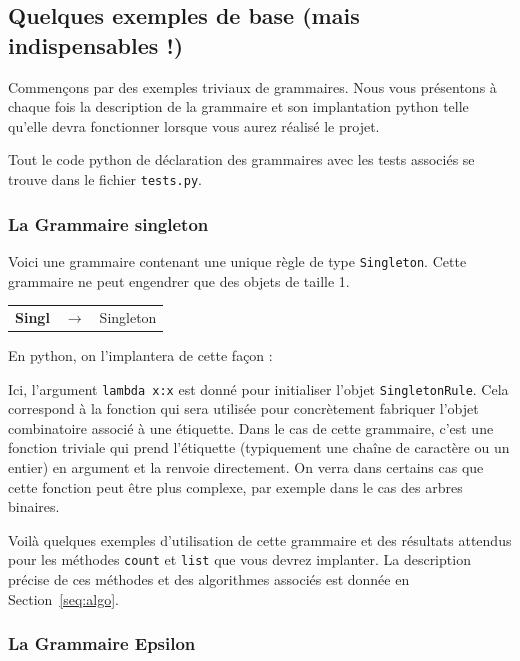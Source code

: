 \documentclass[11pt]{article}
\begin{document}
\subsection{Quelques exemples de base (mais indispensables !)}

Commençons par des exemples triviaux de grammaires. Nous vous présentons 
à chaque fois la description de la grammaire et son implantation python telle
qu'elle devra fonctionner lorsque vous aurez réalisé le projet. 

Tout le code python de déclaration des grammaires avec les tests associés se trouve
dans le fichier {\tt tests.py}.

\subsubsection{La Grammaire singleton}

Voici une grammaire contenant une unique règle de type {\tt Singleton}. Cette 
grammaire ne peut engendrer que des objets de taille 1. 

\begin{tabular}{lll}
\textbf{Singl} & $\rightarrow$ & Singleton
\end{tabular}

En python, on l'implantera de cette façon :



Ici, l'argument {\tt lambda x:x} est donné pour initialiser l'objet {\tt SingletonRule}.
Cela correspond à la fonction qui sera utilisée pour concrètement fabriquer l'objet 
combinatoire associé à une étiquette. Dans le cas de cette grammaire, c'est une fonction triviale qui prend l'étiquette
(typiquement une chaîne de caractère ou un entier) en argument et la renvoie directement. 
On verra dans certains cas que cette fonction peut être plus complexe, par exemple dans le
cas des arbres binaires.

Voilà quelques exemples d'utilisation de cette grammaire et des résultats attendus pour les méthodes 
{\tt count} et {\tt list} que vous devrez implanter. La description précise de ces méthodes et des 
algorithmes associés est donnée en Section~\ref{seq:algo}.



\subsubsection{La Grammaire Epsilon}
\end{document}
